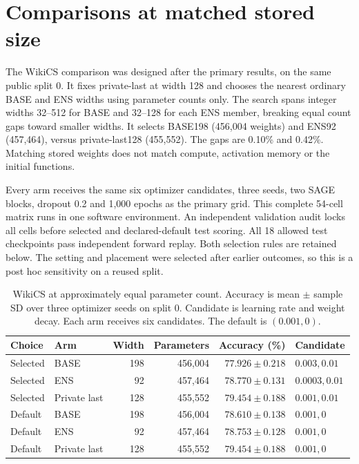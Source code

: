 \section{Comparisons at matched stored size}\label{app:matched-budget}
The WikiCS comparison was designed after the primary results, on the
same public split 0. It fixes private-last at width 128 and chooses
the nearest ordinary BASE and ENS widths using parameter counts only.
The search spans integer widths 32--512 for BASE and 32--128 for each
ENS member, breaking equal count gaps toward smaller widths. It selects
BASE198 (456,004 weights) and ENS92 (457,464), versus private-last128
(455,552). The gaps are 0.10\% and 0.42\%. Matching stored weights does
not match compute, activation memory or the initial functions.

Every arm receives the same six optimizer candidates, three seeds,
two SAGE blocks, dropout 0.2 and 1,000 epochs as the primary grid.
This complete 54-cell matrix runs in one software environment.
An independent validation audit locks all cells before selected and
declared-default test scoring. All 18 allowed test checkpoints pass
independent forward replay. Both selection rules are retained below.
The setting and placement were selected after earlier outcomes,
so this is a post hoc sensitivity on a reused split.

\begin{table}[t]
\centering\small
\setlength{\tabcolsep}{4pt}
\caption{WikiCS at approximately equal parameter count. Accuracy is mean $\pm$ sample SD over three optimizer seeds on split 0. Candidate is learning rate and weight decay. Each arm receives six candidates. The default is $(0.001,0)$.}
\label{tab:wikics-matched-budget}
\begin{tabular}{llrrrl}
\toprule
Choice & Arm & Width & Parameters & Accuracy (\%) & Candidate\\
\midrule
Selected & BASE & 198 & 456,004 & $77.926 \pm 0.218$ & $0.003, 0.01$\\
Selected & ENS & 92 & 457,464 & $78.770 \pm 0.131$ & $0.0003, 0.01$\\
Selected & Private last & 128 & 455,552 & $79.454 \pm 0.188$ & $0.001, 0.01$\\
Default & BASE & 198 & 456,004 & $78.610 \pm 0.138$ & $0.001, 0$\\
Default & ENS & 92 & 457,464 & $78.753 \pm 0.128$ & $0.001, 0$\\
Default & Private last & 128 & 455,552 & $79.454 \pm 0.188$ & $0.001, 0$\\
\bottomrule
\end{tabular}
\end{table}

